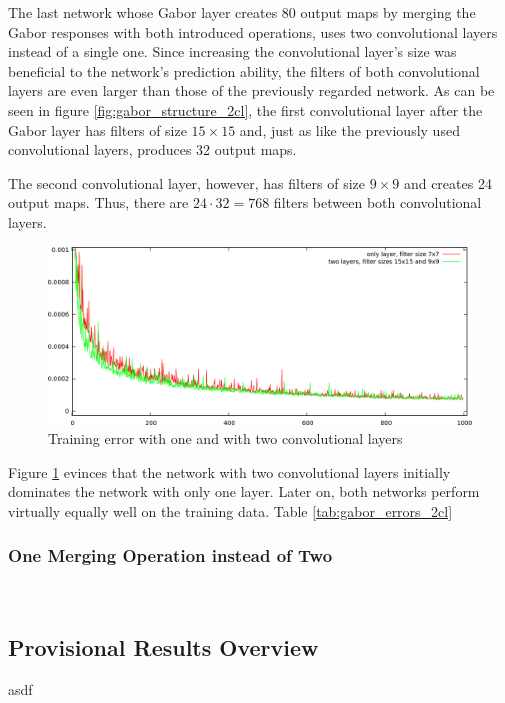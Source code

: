 \documentclass[11pt, a4paper]{article}
\begin{document}
The last network whose Gabor layer creates 80 output maps by merging the Gabor responses with both introduced operations, uses two convolutional layers instead of a single one. Since increasing the convolutional layer's size was beneficial to the network's prediction ability, the filters of both convolutional layers are even larger than those of the previously regarded network. As can be seen in figure \ref{fig:gabor_structure_2cl}, the first convolutional layer after the Gabor layer has filters of size $15\times15$ and, just as like the previously used convolutional layers, produces 32 output maps.

The second convolutional layer, however, has filters of size $9\times9$ and creates 24 output maps. Thus, there are $24\cdot32=768$ filters between both convolutional layers.
\begin{figure}[h!]
	\centering
	\includegraphics[width=\textwidth]{images/results/gabor_absatan2_2cl.png}
	\caption{Training error with one and with two convolutional layers}
	\label{fig:gabor_absatan2_2cl}
\end{figure}
Figure \ref{fig:gabor_absatan2_2cl} evinces that the network with two convolutional layers initially dominates the network with only one layer. Later on, both networks perform virtually equally well on the training data. Table \ref{tab:gabor_errors_2cl}




\subsubsection{One Merging Operation instead of Two}

\textcolor{white}{asdfas}%
\newpage

\subsection*{Provisional Results Overview}
asdf
\end{document}
